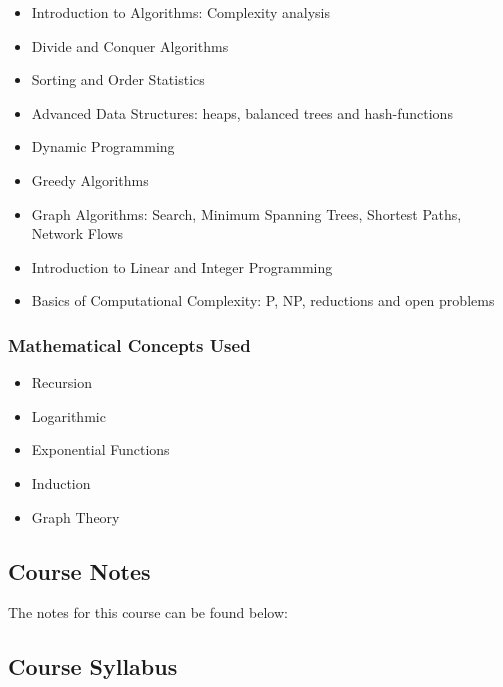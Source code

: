 {\begin{highlight}[\CSPBAlgo]
        \begin{itemize}
            \item Introduction to Algorithms: Complexity analysis
            \item Divide and Conquer Algorithms
            \item Sorting and Order Statistics
            \item Advanced Data Structures: heaps, balanced trees and hash-functions
            \item Dynamic Programming
            \item Greedy Algorithms
            \item Graph Algorithms: Search, Minimum Spanning Trees, Shortest Paths, Network Flows
            \item Introduction to Linear and Integer Programming
            \item Basics of Computational Complexity: P, NP, reductions and open problems
        \end{itemize}
    
        \subsubsection*{Mathematical Concepts Used}
        
        \begin{itemize}
            \item Recursion
            \item Logarithmic
            \item Exponential Functions
            \item Induction
            \item Graph Theory
        \end{itemize}
    \end{highlight}
}

\subsection{Course Notes}

The notes for this course can be found below: 

\subsection{Course Syllabus}

